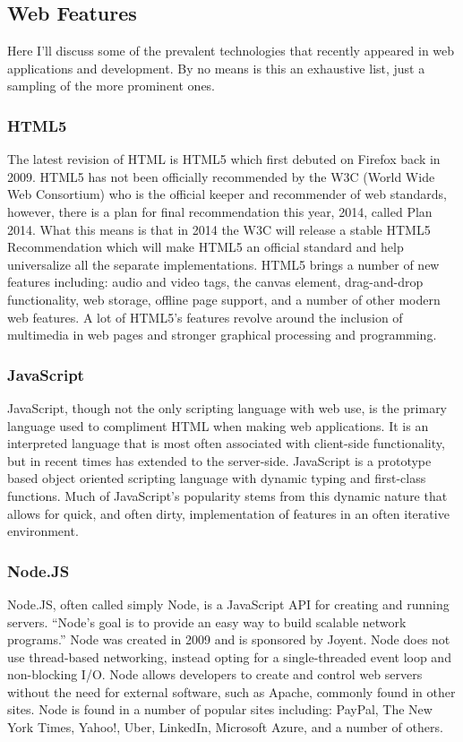 \documentclass[11pt]{article}
\begin{document}
\subsection{Web Features}
Here I'll discuss some of the prevalent technologies that recently appeared in web applications and development. By no means is this an exhaustive list, just a sampling of the more prominent ones.

\subsubsection{HTML5}
The latest revision of HTML is HTML5 which first debuted on Firefox back in 2009. \cite{EvolutionOfWeb} HTML5 has not been officially recommended by the W3C (World Wide Web Consortium) who is the official keeper and recommender of web standards, however, there is a plan for final recommendation this year, 2014, called Plan 2014. \cite{Plan2014} What this means is that in 2014 the W3C will release a stable HTML5 Recommendation which will make HTML5 an official standard and help universalize all the separate implementations.
HTML5 brings a number of new features including: audio and video tags, the canvas element, drag-and-drop functionality, web storage, offline page support, and a number of other modern web features. A lot of HTML5's features revolve around the inclusion of multimedia in web pages and stronger graphical processing and programming.

\subsubsection{JavaScript}
JavaScript, though not the only scripting language with web use, is the primary language used to compliment HTML when making web applications. It is an interpreted language that is most often associated with client-side functionality, but in recent times has extended to the server-side. JavaScript is a prototype based object oriented scripting language with dynamic typing and first-class functions. Much of JavaScript's popularity stems from this dynamic nature that allows for quick, and often dirty, implementation of features in an often iterative environment.

\subsubsection{Node.JS}
Node.JS, often called simply Node, is a JavaScript API for creating and running servers. ``Node's goal is to provide an easy way to build scalable network programs.'' \cite{Node} Node was created in 2009 and is sponsored by Joyent. Node does not use thread-based networking, instead opting for a single-threaded event loop and non-blocking I/O. Node allows developers to create and control web servers without the need for external software, such as Apache, commonly found in other sites.
Node is found in a number of popular sites including: PayPal, The New York Times, Yahoo!, Uber, LinkedIn, Microsoft Azure, and a number of others. \cite{Node}
\end{document}
